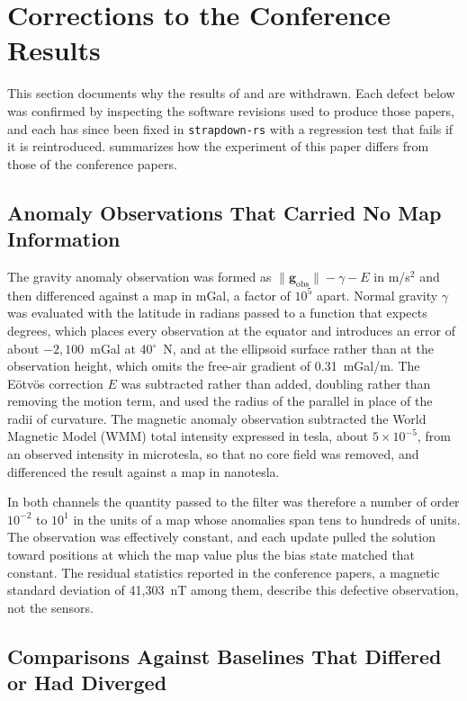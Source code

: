 \section{Corrections to the Conference Results}
\label{sec:corrections}

This section documents why the results of \citet{anom-ukf} and \citet{anom-pf} are withdrawn. Each defect below was confirmed by inspecting the software revisions used to produce those papers, and each has since been fixed in \texttt{strapdown-rs} with a regression test that fails if it is reintroduced.  summarizes how the experiment of this paper differs from those of the conference papers.

\subsection{Anomaly Observations That Carried No Map Information}

The gravity anomaly observation was formed as \(\lVert\mathbf{g}_\text{obs}\rVert - \gamma - E\) in m/s\(^2\) and then differenced against a map in mGal, a factor of \(10^5\) apart. Normal gravity \(\gamma\) was evaluated with the latitude in radians passed to a function that expects degrees, which places every observation at the equator and introduces an error of about \(-2{,}100\)~mGal at 40\(^\circ\)~N, and at the ellipsoid surface rather than at the observation height, which omits the free-air gradient of 0.31~mGal/m. The E\"{o}tv\"{o}s correction \(E\) was subtracted rather than added, doubling rather than removing the motion term, and used the radius of the parallel in place of the radii of curvature. The magnetic anomaly observation subtracted the World Magnetic Model (WMM) total intensity expressed in tesla, about \(5\times10^{-5}\), from an observed intensity in microtesla, so that no core field was removed, and differenced the result against a map in nanotesla.

In both channels the quantity passed to the filter was therefore a number of order \(10^{-2}\) to \(10^{1}\) in the units of a map whose anomalies span tens to hundreds of units. The observation was effectively constant, and each update pulled the solution toward positions at which the map value plus the bias state matched that constant. The residual statistics reported in the conference papers, a magnetic standard deviation of 41{,}303~nT among them, describe this defective observation, not the sensors.

\subsection{Comparisons Against Baselines That Differed or Had Diverged}

